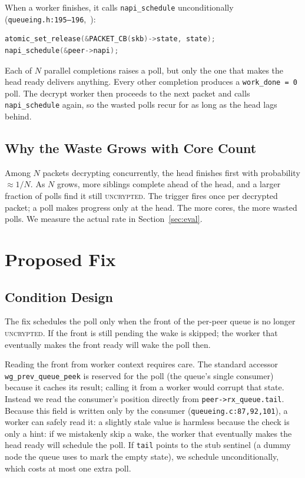 \documentclass{article}
\begin{document}
When a worker finishes, it calls \texttt{napi\_schedule} unconditionally
(\texttt{queueing.h:195--196},~\cite{wireguard-linux}):

\begin{lstlisting}[language=C]
atomic_set_release(&PACKET_CB(skb)->state, state);
napi_schedule(&peer->napi);
\end{lstlisting}

Each of $N$ parallel completions raises a poll, but only the one that makes
the head ready delivers anything. Every other completion produces a
\texttt{work\_done = 0} poll. The decrypt worker then proceeds to the next
packet and calls \texttt{napi\_schedule} again, so the wasted polls recur for
as long as the head lags behind.

\subsection{Why the Waste Grows with Core Count}

Among $N$ packets decrypting concurrently, the head finishes first with
probability $\approx 1/N$. As $N$ grows, more siblings complete ahead of the
head, and a larger fraction of polls find it still \textsc{uncrypted}. The
trigger fires once per decrypted packet; a poll makes progress only at the head.
The more cores, the more wasted polls. We measure the actual rate in
Section~\ref{sec:eval}.

\section{Proposed Fix}
\label{sec:fix}

\subsection{Condition Design}

The fix schedules the poll only when the front of the per-peer queue is no
longer \textsc{uncrypted}. If the front is still pending the wake is skipped;
the worker that eventually makes the front ready will wake the poll then.

Reading the front from worker context requires care. The standard accessor
\texttt{wg\_prev\_queue\_peek} is reserved for the poll (the queue's single
consumer) because it caches its result; calling it from a worker would corrupt
that state. Instead we read the consumer's position directly from
\texttt{peer->rx\_queue.tail}. Because this field is written only by the
consumer (\texttt{queueing.c:87,92,101}), a worker can safely read it: a
slightly stale value is harmless because the check is only a hint: if we
mistakenly skip a wake, the worker that eventually makes the head ready will
schedule the poll. If \texttt{tail} points to the stub sentinel (a dummy node
the queue uses to mark the empty state), we schedule unconditionally, which
costs at most one extra poll.
\end{document}
